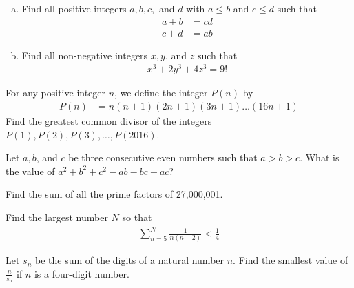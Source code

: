 \documentclass[problems.tex]{subfile}
\begin{document}
	\begin{problem} $ $
		\begin{enumerate}[(a)]
			\item Find all positive integers $a, b, c,$ and $d$ with $a \leq b$ and $c \leq d$ such that
				\begin{align*}
					a + b &= cd\\
					c + d &= ab
				\end{align*}
			\item Find all non-negative integers $x, y$, and $z$ such that
				\begin{align*}
					x^3 + 2y^3 + 4z^3 = 9!
				\end{align*}
		\end{enumerate}
	\end{problem}

	\begin{problem}
		For any positive integer $n$, we define the integer $P(n)$ by
			\begin{align*}
				P(n)
					& = n(n+1)(2n+1)(3n+1)\dots(16n+1)
			\end{align*}
		Find the greatest common divisor of the integers $P(1), P(2), P(3),\dots,P(2016)$. %
	\end{problem}

	\begin{problem}
		Let $a, b$, and $c$ be three consecutive even numbers such that $a > b > c$. What is the value of $a^2 + b^2 + c^2 - ab - bc - ac$?
	\end{problem}

	\begin{problem}
		Find the sum of all the prime factors of 27,000,001.
	\end{problem}

	\begin{problem}
		Find the largest number $N$ so that
		\begin{align*}
			\sum_{n=5}^{N} \frac{1}{n(n-2)} < \frac{1}{4}
		\end{align*}
	\end{problem}

	\begin{problem}
		Let $s_n$ be the sum of the digits of a natural number $n$. Find the smallest value of $\frac{n}{s_n}$ if $n$ is a four-digit number.
	\end{problem}
\end{document}
